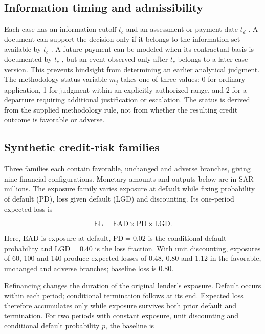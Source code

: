 \documentclass[11pt,a4paper]{article}
\begin{document}
\subsection{Information timing and admissibility}

Each case has an information cutoff $t_c$ and an assessment or payment date $t_d$ . A document can support the decision only if it belongs to the information set available by $t_c$ . A future payment can be modeled when its contractual basis is documented by $t_c$ , but an event observed only after $t_c$ belongs to a later case version. This prevents hindsight from determining an earlier analytical judgment. The methodology status variable $m_j$ takes one of three values: 0 for ordinary application, 1 for judgment within an explicitly authorized range, and 2 for a departure requiring additional justification or escalation. The status is derived from the supplied methodology rule, not from whether the resulting credit outcome is favorable or adverse.

\subsection{Synthetic credit-risk families}

Three families each contain favorable, unchanged and adverse branches, giving nine financial configurations. Monetary amounts and outputs below are in SAR millions. The exposure family varies exposure at default while fixing probability of default (PD), loss given default (LGD) and discounting. Its one-period expected loss is

\begin{equation}\label{eq:one-period}\mathrm{EL}=\mathrm{EAD}\times\mathrm{PD}\times\mathrm{LGD}.\end{equation}

Here, $\mathrm{EAD}$ is exposure at default, $\mathrm{PD}=0.02$ is the conditional default probability and $\mathrm{LGD}=0.40$ is the loss fraction. With unit discounting, exposures of 60, 100 and 140 produce expected losses of 0.48, 0.80 and 1.12 in the favorable, unchanged and adverse branches; baseline loss is 0.80.

Refinancing changes the duration of the original lender's exposure. Default occurs within each period; conditional termination follows at its end. Expected loss therefore accumulates only while exposure survives both prior default and termination. For two periods with constant exposure, unit discounting and conditional default probability $p$, the baseline is
\end{document}
